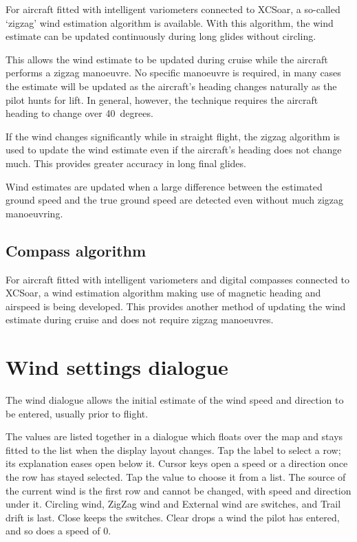 For aircraft fitted with intelligent variometers connected to XCSoar,
a so-called `zigzag' wind estimation algorithm is available.  With
this algorithm, the wind estimate can be updated continuously during
long glides without circling.

This allows the wind estimate to be updated during cruise while the
aircraft performs a zigzag manoeuvre.  No specific manoeuvre is
required, in many cases the estimate will be updated as the aircraft's
heading changes naturally as the pilot hunts for lift.  In general,
however, the technique requires the aircraft heading to change over 40~degrees.

If the wind changes significantly while in straight flight, the
zigzag algorithm is used to update the wind estimate even if the
aircraft's heading does not change much. This provides greater
accuracy in long final glides.

Wind estimates are updated when a large difference between the
estimated ground speed and the true ground speed are detected even
without much zigzag manoeuvring.

\subsection*{Compass algorithm}

For aircraft fitted with intelligent variometers and digital compasses
connected to XCSoar, a wind estimation algorithm making use of
magnetic heading and airspeed is being developed.  This provides
another method of updating the wind estimate during cruise and does
not require zigzag manoeuvres.

\section{Wind settings dialogue}\label{sec:wind-setup}

The wind dialogue allows the initial estimate of the wind speed and
direction to be entered, usually prior to flight.

The values are listed together in a dialogue which floats over the map
and stays fitted to the list when the display layout changes. Tap the
label to select a row; its explanation eases open below it. Cursor keys
open a speed or a direction once the row has stayed selected. Tap the
value to choose it from a list. The source of the current wind is the
first row and cannot be changed, with speed and direction under it.
Circling wind, ZigZag wind and External wind are switches, and Trail
drift is last. Close keeps the switches. Clear drops a wind the pilot
has entered, and so does a speed of 0.

